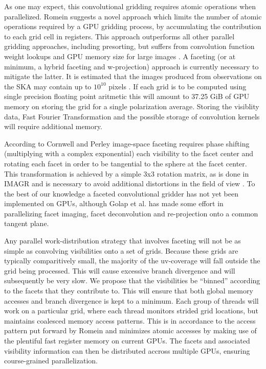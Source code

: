 \documentclass[a4paper, two column]{article}
\begin{document}
 As one may expect, this convolutional gridding requires atomic operations when parallelized. Romein \cite{romein2012efficient} suggests a novel approach which limits the number of atomic operations required by a GPU gridding process, by accumulating
 the contribution to each grid cell in registers. This approach outperforms all other parallel gridding approaches, including presorting, but suffers from convolution function weight lookups and GPU memory size for large images \cite{muscat2014high}.
 A faceting (or at minimum, a hybrid faceting and w-projection) approach is currently necessary to mitigate the latter. It is estimated that the images produced from observations on the SKA may contain up to $10^{10}$ pixels \cite{cornwell2012wide}. 
 If each grid is to be computed using single precision floating point aritmetic this will amount to 37.25 GiB of GPU memory on storing the grid for a single polarization average. Storing the visiblity data, Fast Fourier Transformation and the possible 
 storage of convolution kernels will require additional memory. 
 
 According to Cornwell and Perley \cite{cornwell1992radio} image-space faceting requires phase shifting (multiplying with a complex exponential) each visibility to the facet center and rotating each facet in order to 
 be tangential to the sphere at the facet center. This transformation is achieved by a simple 3x3 rotation matrix, as is done in IMAGR \cite{AIPS113} and is necessary to avoid additional distortions in the field of view \cite[pg. 395]{taylor1999synthesis}. To the best of our knowledge 
 a faceted convolutional gridder has not yet been implemented on GPUs, although Golap et al. \cite{golap2001parallelization} has made some effort in parallelizing facet imaging, facet deconvolution and re-projection onto a common tangent plane.
 
 Any parallel work-distribution strategy that involves faceting will not be as simple as convolving visibilities onto a set of grids. Because these grids are typically comparitively small, the majority of the uv-coverage will fall outside the grid being processed. This will cause 
 excessive branch divergence and will subsequently be very slow. We propose that the visibilities be ``binned'' according to the facets that they contribute to. This will ensure that both global memory accesses and branch divergence is kept to a minimum. Each group of threads will
 work on a particular grid, where each thread monitors strided grid locations, but maintains coalesced memory access patterns. This is in accordance to the access pattern put forward by Romein \cite{romein2012efficient} and minimizes atomic accesses by making use of the plentiful fast 
 register memory on current GPUs. The facets and associated visibility information can then be distributed accross multiple GPUs, ensuring course-grained parallelization.
\end{document}
